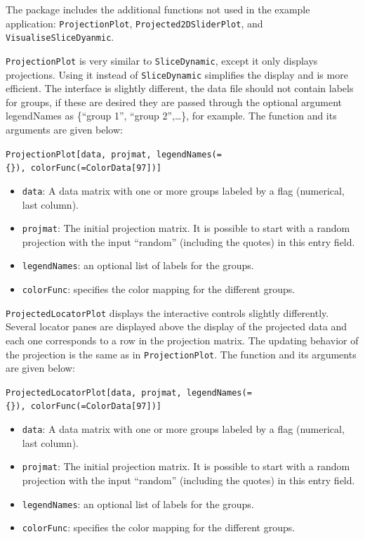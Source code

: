\documentclass[]{interact}
\theoremstyle{plain}%
\theoremstyle{definition}
\theoremstyle{remark}
\def\tightlist{}
\begin{document}
The package includes the additional functions not used in the example
application: \texttt{ProjectionPlot}, \texttt{Projected2DSliderPlot},
and \texttt{VisualiseSliceDyanmic}.

\texttt{ProjectionPlot} is very similar to \texttt{SliceDynamic}, except
it only displays projections. Using it instead of \texttt{SliceDynamic}
simplifies the display and is more efficient. The interface is slightly
different, the data file should not contain labels for groups, if these
are desired they are passed through the optional argument legendNames as
\{``group 1'', ``group 2'',\ldots\}, for example. The function and its
arguments are given below:

\texttt{ProjectionPlot{[}data,\ projmat,\ legendNames(=\{\}),\ colorFunc(=ColorData{[}97{]}){]}}

\begin{itemize}
\tightlist
\item
  \texttt{data}: A data matrix with one or more groups labeled by a flag
  (numerical, last column).
\item
  \texttt{projmat}: The initial projection matrix. It is possible to
  start with a random projection with the input ``random'' (including
  the quotes) in this entry field.
\item
  \texttt{legendNames}: an optional list of labels for the groups.
\item
  \texttt{colorFunc}: specifies the color mapping for the different
  groups.
\end{itemize}

\texttt{ProjectedLocatorPlot} displays the interactive controls slightly
differently. Several locator panes are displayed above the display of
the projected data and each one corresponds to a row in the projection
matrix. The updating behavior of the projection is the same as in
\texttt{ProjectionPlot}. The function and its arguments are given below:

\texttt{ProjectedLocatorPlot{[}data,\ projmat,\ legendNames(=\{\}),\ colorFunc(=ColorData{[}97{]}){]}}

\begin{itemize}
\tightlist
\item
  \texttt{data}: A data matrix with one or more groups labeled by a flag
  (numerical, last column).
\item
  \texttt{projmat}: The initial projection matrix. It is possible to
  start with a random projection with the input ``random'' (including
  the quotes) in this entry field.
\item
  \texttt{legendNames}: an optional list of labels for the groups.
\item
  \texttt{colorFunc}: specifies the color mapping for the different
  groups.
\end{itemize}
\end{document}
